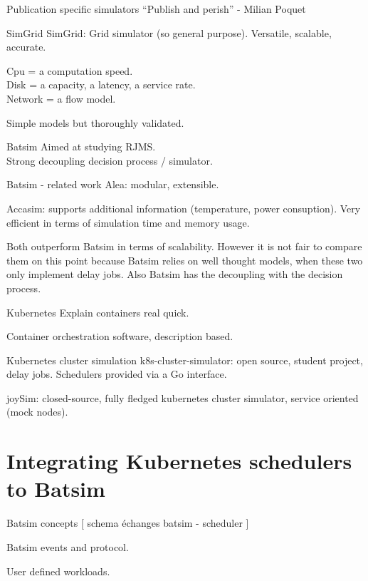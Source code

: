 \documentclass[12pt, aspectratio=43]{beamer}
\begin{document}
\begin{frame}{Publication specific simulators}
	``Publish and perish'' - Milian Poquet
\end{frame}

\begin{frame}{SimGrid}
	SimGrid: Grid simulator (so general purpose). Versatile, scalable,
	accurate.

	Cpu = a computation speed.\\
	Disk = a capacity, a latency, a service rate.\\
	Network = a flow model.

	Simple models but thoroughly validated.
\end{frame}

\begin{frame}{Batsim}
	Aimed at studying RJMS.\\
	Strong decoupling decision process / simulator.
\end{frame}

\begin{frame}{Batsim - related work}
	Alea: modular, extensible.

	Accasim: supports additional information (temperature, power
	consuption). Very efficient in terms of simulation time and memory
	usage.

	Both outperform Batsim in terms of scalability. However it is not fair
	to compare them on this point because Batsim relies on well thought
	models, when these two only implement delay jobs. Also Batsim has the
	decoupling with the decision process.
\end{frame}

\begin{frame}{Kubernetes}
	Explain containers real quick.

	Container orchestration software, description based.
\end{frame}

\begin{frame}{Kubernetes cluster simulation}
	k8s-cluster-simulator: open source, student project, delay jobs.
	Schedulers provided via a Go interface.

	joySim: closed-source, fully fledged kubernetes cluster simulator,
	service oriented (mock nodes).
\end{frame}

\section{Integrating Kubernetes schedulers to Batsim}
\begin{frame}{Batsim concepts}
	[ schema échanges batsim - scheduler ]

	Batsim events and protocol.

	User defined workloads.
\end{frame}
\end{document}
